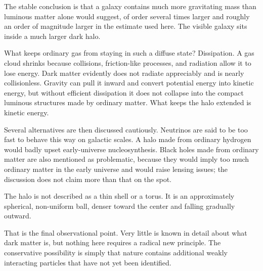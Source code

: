 \begin{classroomqa}
\end{classroomqa}

The stable conclusion is that a galaxy contains much more gravitating mass than luminous matter alone would suggest, of order several times larger and roughly an order of magnitude larger in the estimate used here. The visible galaxy sits inside a much larger dark halo.

What keeps ordinary gas from staying in such a diffuse state? Dissipation. A gas cloud shrinks because collisions, friction-like processes, and radiation allow it to lose energy. Dark matter evidently does not radiate appreciably and is nearly collisionless. Gravity can pull it inward and convert potential energy into kinetic energy, but without efficient dissipation it does not collapse into the compact luminous structures made by ordinary matter. What keeps the halo extended is kinetic energy.

Several alternatives are then discussed cautiously. Neutrinos are said to be too fast to behave this way on galactic scales. A halo made from ordinary hydrogen would badly upset early-universe nucleosynthesis. Black holes made from ordinary matter are also mentioned as problematic, because they would imply too much ordinary matter in the early universe and would raise lensing issues; the discussion does not claim more than that on the spot.

The halo is not described as a thin shell or a torus. It is an approximately spherical, non-uniform ball, denser toward the center and falling gradually outward.

\begin{classroomqa}
\end{classroomqa}

That is the final observational point. Very little is known in detail about what dark matter is, but nothing here requires a radical new principle. The conservative possibility is simply that nature contains additional weakly interacting particles that have not yet been identified.
